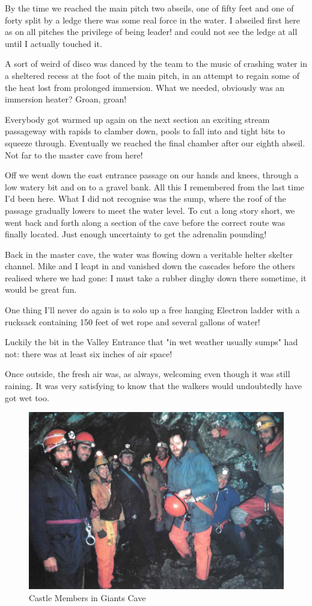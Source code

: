 \documentclass[a5paper,openany,font 10pt]{scrbook}
\begin{document}
By the time we reached the main pitch   two abseils, one of
fifty feet and one of forty split by a ledge   there was some
real force in the water. I abseiled first here as on all pitches
 the privilege of being leader!  and could not see the ledge at
all until I actually touched it.

A sort of weird of disco was danced by the team to the music
of crashing water in a sheltered recess at the foot of the main
pitch, in an attempt to regain some of the heat lost from
prolonged immersion. What we needed, obviously was an immersion
heater? Groan, groan!

Everybody got warmed up again on the next section   an
exciting stream passageway with rapids to clamber down, pools to
fall into and tight bits to squeeze through. Eventually we
reached the final chamber after our eighth abseil. Not far to the
master cave from here!

Off we went down the east entrance passage on our hands and
knees, through a low watery bit and on to a gravel bank. All this
I remembered from the last time I'd been here. What I did not
recognise was the sump, where the roof of the passage gradually
lowers to meet the water level. To cut a long story short, we
went back and forth along a section of the cave before the
correct route was finally located. Just enough uncertainty to get
the adrenalin pounding!

Back in the master cave, the water was flowing down a
veritable helter skelter channel. Mike and I leapt in and
vanished down the cascades before the others realised where we
had gone: I must take a rubber dinghy down there sometime, it
would be great fun.

One thing I'll never do again is to solo up a free hanging
Electron ladder with a rucksack containing 150 feet of wet rope
and several gallons of water!

Luckily the bit in the Valley Entrance that "in wet weather
usually sumps" had not: there was at least six inches of air
space!

Once outside, the fresh air was, as always, welcoming   even
though it was still raining. It was very satisfying to know that
the walkers would undoubtedly have got wet too.
\begin{figure}[htb]
\centering
\includegraphics[width=.9\linewidth]{./images/Castle_Members_in_Giants_Cave.jpg}
\caption{\label{fig:org7186d7d}
Castle Members in Giants Cave}
\end{figure}
\end{document}
